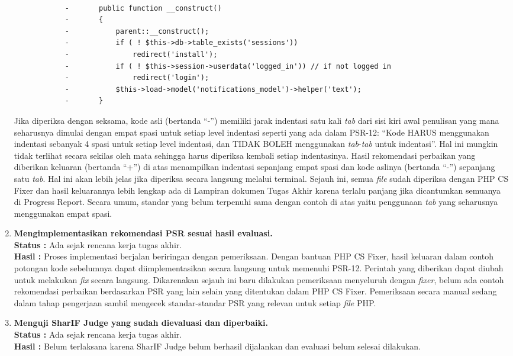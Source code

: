 \documentclass[a4paper,twoside]{article}
\begin{document}
\begin{enumerate}
\begin{lstlisting}[frame=single,language=diff]
				
			-		public function __construct()
			-		{
			-			parent::__construct();
			-			if ( ! $this->db->table_exists('sessions'))
			-				redirect('install');
			-			if ( ! $this->session->userdata('logged_in')) // if not logged in
			-				redirect('login');
			-			$this->load->model('notifications_model')->helper('text');
			-		}
			\end{lstlisting}
			Jika diperiksa dengan seksama, kode asli (bertanda ``-'') memiliki jarak indentasi satu kali \textit{tab} dari sisi kiri awal penulisan yang mana seharusnya dimulai dengan empat spasi untuk setiap level indentasi seperti yang ada dalam PSR-12: ``Kode HARUS menggunakan indentasi sebanyak 4 spasi untuk setiap level indentasi, dan TIDAK BOLEH menggunakan \textit{tab}-\textit{tab} untuk indentasi''. Hal ini mungkin tidak terlihat secara sekilas oleh mata sehingga harus diperiksa kembali setiap indentasinya. Hasil rekomendasi perbaikan yang diberikan keluaran (bertanda ``+'') di atas menampilkan indentasi sepanjang empat spasi dan kode aslinya (bertanda ``-'') sepanjang satu \textit{tab}. Hal ini akan lebih jelas jika diperiksa secara langsung melalui terminal. 
			Sejauh ini, semua \textit{file} sudah diperiksa dengan PHP CS Fixer dan hasil keluarannya lebih lengkap ada di Lampiran dokumen Tugas Akhir karena terlalu panjang jika dicantumkan semuanya di Progress Report. Secara umum, standar yang belum terpenuhi sama dengan contoh di atas yaitu penggunaan \textit{tab} yang seharusnya menggunakan empat spasi. 			
			\item \textbf{Mengimplementasikan rekomendasi PSR sesuai hasil evaluasi.}\\
			{\bf Status :} Ada sejak rencana kerja tugas akhir.\\
			{\bf Hasil :} Proses implementasi berjalan beriringan dengan pemeriksaan. Dengan bantuan PHP CS Fixer, hasil keluaran dalam contoh potongan kode sebelumnya dapat diimplementasikan secara langsung untuk memenuhi PSR-12. Perintah yang diberikan dapat diubah untuk melakukan \textit{fix} secara langsung. Dikarenakan sejauh ini baru dilakukan pemeriksaan menyeluruh dengan \textit{fixer}, belum ada contoh rekomendasi perbaikan berdasarkan PSR yang lain selain yang ditentukan dalam PHP CS Fixer. Pemeriksaan secara manual sedang dalam tahap pengerjaan sambil mengecek standar-standar PSR yang relevan untuk setiap \textit{file} PHP. 
			
			\item \textbf{Menguji SharIF Judge yang sudah dievaluasi dan diperbaiki.}\\
			{\bf Status :} Ada sejak rencana kerja tugas akhir.\\
			{\bf Hasil :} Belum terlaksana karena SharIF Judge belum berhasil dijalankan dan evaluasi belum selesai dilakukan. 
			

\end{enumerate}
\end{document}
